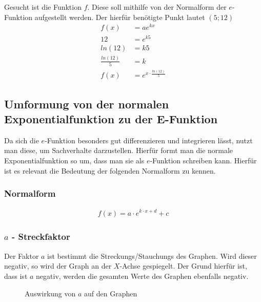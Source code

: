 \begin{beispiel}
	Gesucht ist die Funktion $f$. Diese soll mithilfe von der Normalform der $e$-Funktion aufgestellt werden. Der hierfür benötigte Punkt lautet $(5;12)$
	\begin{align*}
		f(x)&=ae^{kx}\\
		12&=e^{k5}\tag{Anwenden des ln}\\
		ln(12)&=k5\tag{Dividieren mit 5}\\
		\frac{ln(12)}{5}&=k\\
		f(x)&=e^{x\cdot \frac{ln(12)}{5}}
	\end{align*}
\end{beispiel}
\pagebreak
\subsection{Umformung von der normalen Exponentialfunktion zu der E-Funktion}\label{sec:E-Funktion/Umformung von der normalen Exponentialfunktion zu der E-Funktion}
Da sich die $e$-Funktion besonders gut differenzieren und integrieren lässt, nutzt man diese, um Sachverhalte darzustellen. Hierfür formt man die normale Exponentialfunktion so um, dass man sie als $e$-Funktion schreiben kann. Hierfür ist es relevant die Bedeutung der folgenden Normalform zu kennen. 
\subsubsection{Normalform}\label{sec:E-Funktion/Umformung von der normalen Exponentialfunktion zu der E-Funktion/Normalform}
\begin{align*}
	f(x)=a\cdot e^{k\cdot x+d}+c
\end{align*}
\pagebreak
\subsubsection{$a$ - Streckfaktor}\label{sec:E-Funktion/Umformung von der normalen Exponentialfunktion zu der E-Funktion/Normalform/a - Streckfaktor}
Der Faktor $a$ ist bestimmt die Streckungs/Stauchungs des Graphen. Wird dieser negativ, so wird der Graph an der $X$-Achse gespiegelt. Der Grund hierfür ist, dass ist $a$ negativ, werden die gesamten Werte des Graphen ebenfalls negativ. 
\begin{figure}[h]
\centering
	\caption{Auswirkung von $a$ auf den Graphen}
\end{figure}
\pagebreak

